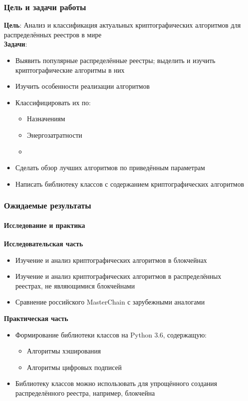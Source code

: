 \documentclass{beamer}
\begin{document}
\begin{frame}
    \frametitle{Цель и задачи работы}
    \textbf{Цель}: Анализ и классификация актуальных криптографических
    алгоритмов для распределённых реестров в мире\\
    \textbf{Задачи}:
    \begin{itemize}
        \item Выявить популярные распределённые реестры; выделить и изучить
              криптографические алгоритмы в них
        \item Изучить особенности реализации алгоритмов
        \item Классифицировать их по:
        \begin{itemize}
            \item Назначениям
            \item Энергозатратности
            \item 
        \end{itemize}
        \item Сделать обзор лучших алгоритмов по приведённым параметрам
        \item Написать библиотеку классов с содержанием криптографических алгоритмов
\end{itemize}
\end{frame}

\begin{frame}
    \frametitle{Ожидаемые результаты}
    \framesubtitle{Исследование и практика}
    \begin{multicols}{2}
        \textbf{Исследовательская часть}
        \begin{itemize}
            \item Изучение и анализ криптографических алгоритмов в блокчейнах
            \item Изучение и анализ криптографических алгоритмов в
                распределённых реестрах, не являющимися блокчейнами
            \item Сравнение российского MasterChain с зарубежными аналогами
        \end{itemize}
        \bigskip
        \columnbreak
        \textbf{Практическая часть}
        \begin{itemize}
            \item Формирование библиотеки классов на Python 3.6, содержащую:
                    \begin{itemize}
                        \item Алгоритмы хэширования
                        \item Алгоритмы цифровых подписей
                    \end{itemize}
            \item Библиотеку классов можно использовать для упрощённого
                  создания распределённого реестра, например,
                  блокчейна
        \end{itemize}
    \end{multicols}
\end{frame}
\end{document}
